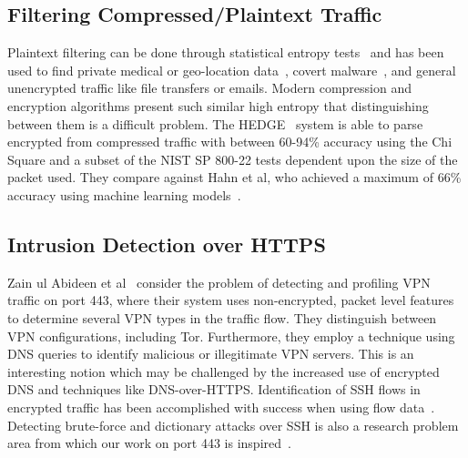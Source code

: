\subsection{Filtering Compressed/Plaintext Traffic}
Plaintext filtering can be done through statistical entropy tests~\cite{wood2017cleartext} and has been used to find private medical or geo-location data~\cite{wood2017cleartext, Shbair2020ASO}, covert malware~\cite{singh2021comparative}, and general unencrypted traffic like file transfers or emails. Modern compression and encryption algorithms present such similar high entropy that distinguishing between them is a difficult problem. The HEDGE~\cite{hedge} system is able to parse encrypted from compressed traffic with between 60-94\% accuracy using the Chi Square and a subset of the NIST SP 800-22 tests dependent upon the size of the packet used. They compare against Hahn et al, who achieved a maximum of 66\% accuracy using machine learning models~\cite{Hahn2018DetectingCC}.

\subsection{Intrusion Detection over HTTPS}

Zain ul Abideen et al~\cite{abideen2019vpn} consider the problem of detecting and profiling VPN traffic on port 443, where their system uses non-encrypted, packet level features to determine several VPN types in the traffic flow. They distinguish between VPN configurations, including Tor. Furthermore, they employ a technique using DNS queries to identify malicious or illegitimate VPN servers. This is an interesting notion which may be challenged by the increased use of encrypted DNS and techniques like DNS-over-HTTPS. Identification of SSH flows in encrypted traffic has been accomplished with success when using flow data~\cite{Hellemons2012SSHCureAF}. Detecting brute-force and dictionary attacks over SSH is also a research problem area from which our work on port 443 is inspired~\cite{Ghitte2019FingerprintingTU}.
